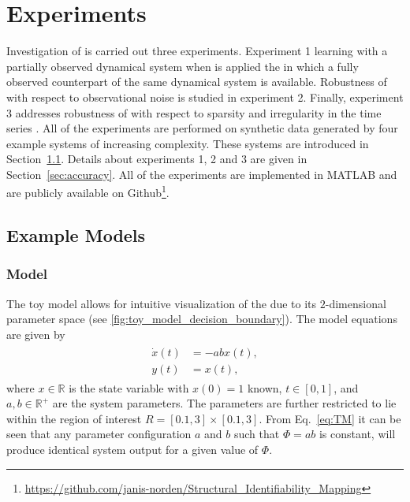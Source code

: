 \section{Experiments}\label{sec:experiments}
Investigation of \myMethod{} is carried out  three experiments.
Experiment 1  learning with a partially observed dynamical system when \myMethod{} is applied  the  in which a fully observed counterpart of the same dynamical system is available.
Robustness of \myMethod{} with respect to observational noise is studied in experiment 2.
Finally, experiment 3 addresses robustness of \myMethod{} with respect to sparsity and irregularity in the time series 
.
All of the experiments are performed on synthetic data generated by four example systems of increasing complexity. 
These systems are introduced in Section~\ref{sec:models}.
Details about experiments 1, 2 and 3 are given in Section~\ref{sec:accuracy}.
All of the experiments are implemented in MATLAB and are publicly available on Github\footnote{\url{https://github.com/janis-norden/Structural_Identifiability_Mapping}}.

\subsection{Example Models}\label{sec:models}

\subsubsection{ Model} 
The toy model allows for intuitive visualization of the  \myMethod{} due to its $2$-dimensional parameter space (see \autoref{fig:toy_model_decision_boundary}).
The model equations are given by
\begin{align} \label{eq:TM}
    \begin{split}
        \dot{x}(t) &= -ab x(t), \\
        y(t)    &= x(t), 
    \end{split}
\end{align}
where $x \in \mathbb{R}$ is the state variable with $x(0)=1$ known, $t \in [0, 1]$, and $a,b \in \mathbb{R}^{+}$ are the system parameters. 
The parameters are further restricted to lie within the region of interest  $R = [0.1, 3] \times [0.1, 3]$.
From Eq.~\eqref{eq:TM} it can be seen that any parameter configuration $a$ and $b$ such that $\Phi = ab$ is constant, will produce identical system output for a given value of $\Phi$. 

